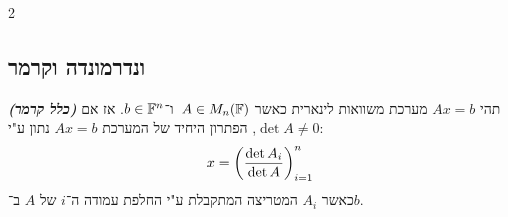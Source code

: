 \documentclass[]{../../../tex/classes/styledArticle}
\begin{document}
\begin{multicols}{2}
		\subsection{ונדרמונדה וקרמר}
		\begin{Theorem}\textit{\textbf{(כלל קרמר)}}
			תהי $Ax = b$ מערכת משוואות לינארית כאשר $A \in M_n(\mathbb{F})$\ ו־$b \in \mathbb{F}^n$. אז אם $\det A \neq 0$, הפתרון היחיד של המערכת $Ax = b$ נתון ע"י: 
			\[ x = \left ( \frac{\det A_i}{\det A} \right )_{i = 1}^{n} \]
			כאשר $A_i$ המטריצה המתקבלת ע"י החלפת עמודה ה־$i$ של $A$ ב־$b$. 
		\end{Theorem}
		
	\end{multicols}
	{\vspace{-30pt}\let\newpage\relax\maketitle\vspace{-100pt}}
	\maketitle
	
\end{document}
